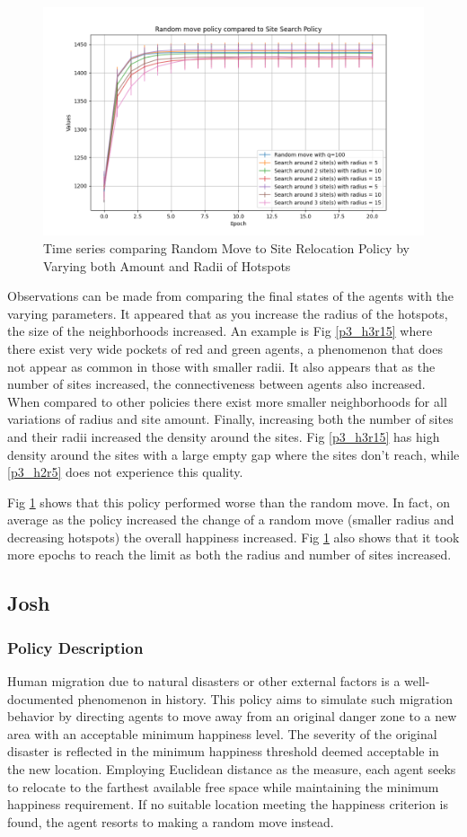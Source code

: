 \documentclass[11pt]{article}
\begin{document}
	\begin{figure}
		\centering
		\includegraphics[width=.5\textwidth]{policies03.png}
		\caption{Time series comparing Random Move to Site Relocation Policy by Varying both Amount and Radii of Hotspots}
		\label{p3_ts}
	\end{figure}
	\FloatBarrier
	Observations can be made from comparing the final states of the agents with the varying parameters. It appeared that as you increase the radius of the hotspots, the size of the neighborhoods increased. An example is Fig \ref{p3_h3r15} where there exist very wide pockets of red and green agents, a phenomenon that does not appear as common in those with smaller radii. It also appears that as the number of sites increased, the connectiveness between agents also increased. When compared to other policies there exist more smaller neighborhoods for all variations of radius and site amount. Finally, increasing both the number of sites and their radii increased the density around the sites. Fig \ref{p3_h3r15} has high density around the sites with a large empty gap where the sites don’t reach, while \ref{p3_h2r5} does not experience this quality.\par
	Fig \ref{p3_ts} shows that this policy performed worse than the random move. In fact, on average as the policy increased the change of a random move (smaller radius and decreasing hotspots) the overall happiness increased. Fig \ref{p3_ts} also shows that it took more epochs to reach the limit as both the radius and number of sites increased. 

	
	\newpage
	
	\subsection{Josh}
	\subsubsection{Policy Description}
	Human migration due to natural disasters or other external factors is a well-documented phenomenon in history. This policy aims to simulate such migration behavior by directing agents to move away from an original danger zone to a new area with an acceptable minimum happiness level. The severity of the original disaster is reflected in the minimum happiness threshold deemed acceptable in the new location.
	Employing Euclidean distance as the measure, each agent seeks to relocate to the farthest available free space while maintaining the minimum happiness requirement. If no suitable location meeting the happiness criterion is found, the agent resorts to making a random move instead.
\end{document}
